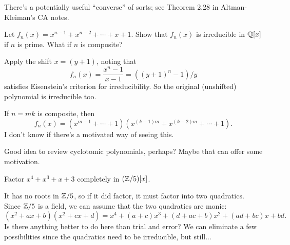 \begin{rem*}
	There's a potentially useful ``converse'' of sorts; see Theorem 2.28 in Altman-Kleiman's CA notes.
\end{rem*}

\begin{problem}
	Let $f_n(x) = x^{n-1} + x^{n-2} + \cdots + x + 1$. Show that $f_n(x)$ is irreducible in $\mathbb{Q}[x]$ if $n$ is prime. What if $n$ is composite?
\end{problem}
\begin{solution}
	Apply the shift $x = (y+1)$, noting that
	\[
		f_n(x) = \frac{x^n - 1}{x - 1} = ((y+1)^n - 1)/y
	\]
	satisfies Eisenstein's criterion for irreducibility. So the original (unshifted) polynomial is irreducible too.
	
	If $n = mk$ is composite, then
	\[
		f_n(x) = (x^{m-1} + \cdots + 1)(x^{(k-1)m} + x^{(k-2) m} + \cdots + 1).
	\]
	I don't know if there's a motivated way of seeing this.
\end{solution}

\begin{rem*}
	Good idea to review cyclotomic polynomials, perhaps? Maybe that can offer some motivation.
\end{rem*}

\begin{problem}
	Factor $x^4 + x^3 + x + 3$ completely in $(\mathbb{Z}/5)[x]$.
\end{problem}
\begin{solution}
	It has no roots in $\mathbb{Z}/5$, so if it did factor, it must factor into two quadratics. Since $\mathbb{Z}/5$ is a field, we can assume that the two quadratics are monic:
	\[
		(x^2 + ax + b)(x^2 + cx + d) = x^4 + (a+c) x^3 + (d + ac + b) x^2 + (ad + bc) x + bd.
	\]
	Is there anything better to do here than trial and error? We can eliminate a few possibilities since the quadratics need to be irreducible, but still...
\end{solution}
